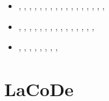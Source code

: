 \begin{small}
\begin{itemize}
                               \textcite{pazs22},  \textcite{bagm22}
\item[\twothousandtwentythree] \textcite{wulq23},  \textcite{zhli23}, \textcite{palb23},
                               \textcite{ankm23},  \textcite{pezg23}, \textcite{izhy23},
                               \textcite{bogj23},  \textcite{lige23}, \textcite{stgc23},
                               \textcite{chzl23},  \textcite{walh23}, \textcite{yams23},
                               \textcite{xumm23},  \textcite{guyg23}, \textcite{sayb23},
                               \textcite{fava23},  \textcite{xicy23}, \textcite{kekg23}
\item[\twothousandtwentyfour]  \textcite{xicc24},  \textcite{fuli24}, \textcite{chzy24},
                               \textcite{sihf24},  \textcite{qicz24}, \textcite{qilb24},
                               \textcite{orbg24},  \textcite{ficd24}, \textcite{magp24},
                               \textcite{xibg24},  \textcite{xicm24}, \textcite{yacz24},
                               \textcite{makb24},  \textcite{culi24}, \textcite{zhhz24},
                               \textcite{erpz24}
\item[\twothousandtwentyfive]  \textcite{masg25},  \textcite{pezg25}, \textcite{ligr25},
                               \textcite{mabg25},  \textcite{cagm25}, \textcite{devf25},
                               \textcite{gugs25},  \textcite{orgb25}, \textcite{orbg25}
\end{itemize}
\end{small}





\section{LaCoDe} 

